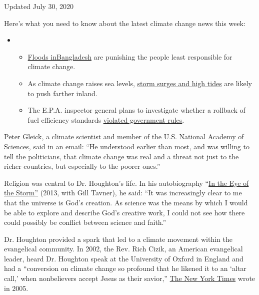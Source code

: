 Updated July 30, 2020

Here's what you need to know about the latest climate change news this
week:

\begin{itemize}
\item
  \begin{itemize}
  \tightlist
  \item
    \href{https://www.nytimes.com/2020/07/30/climate/bangladesh-floods.html?action=click\&pgtype=Article\&state=default\&region=MAIN_CONTENT_1\&context=storylines_keepup}{Floods
    in}\href{https://www.nytimes.com/2020/07/30/climate/bangladesh-floods.html?action=click\&pgtype=Article\&state=default\&region=MAIN_CONTENT_1\&context=storylines_keepup}{Bangladesh}
    are punishing the people least responsible for climate change.
  \item
    As climate change raises sea levels,
    \href{https://www.nytimes.com/2020/07/30/climate/sea-level-inland-floods.html?action=click\&pgtype=Article\&state=default\&region=MAIN_CONTENT_1\&context=storylines_keepup}{storm
    surges and high tides} are likely to push farther inland.
  \item
    The E.P.A. inspector general plans to investigate whether a rollback
    of fuel efficiency standards
    \href{https://www.nytimes.com/2020/07/27/climate/trump-fuel-efficiency-rule.html?action=click\&pgtype=Article\&state=default\&region=MAIN_CONTENT_1\&context=storylines_keepup}{violated
    government rules}.
  \end{itemize}
\end{itemize}

Peter Gleick, a climate scientist and member of the U.S. National
Academy of Sciences, said in an email: ``He understood earlier than
most, and was willing to tell the politicians, that climate change was
real and a threat not just to the richer countries, but especially to
the poorer ones.''

Religion was central to Dr. Houghton's life. In his autobiography
``\href{https://www.amazon.com/Eye-Storm-Autobiography-John-Houghton/dp/0745955843/ref=tmm_pap_swatch_0?_encoding=UTF8\&qid=\&sr=\#reader_0745955843}{In
the Eye of the Storm''} (2013, with Gill Tavner), he said: ``It was
increasingly clear to me that the universe is God's creation. As science
was the means by which I would be able to explore and describe God's
creative work, I could not see how there could possibly be conflict
between science and faith.''

Dr. Houghton provided a spark that led to a climate movement within the
evangelical community. In 2002, the Rev. Rich Cizik, an American
evangelical leader, heard Dr. Houghton speak at the University of Oxford
in England and had a ``conversion on climate change so profound that he
likened it to an `altar call,' when nonbelievers accept Jesus as their
savior,''
\href{https://www.nytimes.com/2005/03/10/us/evangelical-leaders-swing-influence-behind-effort-to-combat-global.html}{The
New York Times} wrote in 2005.

